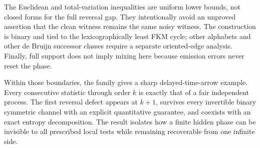 \documentclass[11pt,a4paper]{amsart}
\theoremstyle{definition}
\theoremstyle{remark}
\begin{document}
The Euclidean and total-variation inequalities are uniform lower bounds, not
closed forms for the full reversal gap.  They intentionally avoid an
unproved assertion that the clean witness remains the same noisy witness.
The construction is binary and tied to the lexicographically least FKM
cycle; other alphabets and other de Bruijn successor classes require a
separate oriented-edge analysis.  Finally, full support does not imply
mixing here because emission errors never reset the phase.

Within those boundaries, the family gives a sharp delayed-time-arrow
example.  Every consecutive statistic through order $k$ is exactly that of
a fair independent process.  The first reversal defect appears at $k+1$,
survives every invertible binary symmetric channel with an explicit
quantitative guarantee, and coexists with an exact entropy decomposition.
The result isolates how a finite hidden phase can be invisible to all
prescribed local tests while remaining recoverable from one infinite side.



\end{document}
